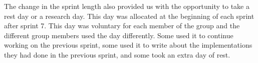 
The change in the sprint length also provided us with the opportunity to take a rest day or a research day. This day was allocated at the beginning of each sprint after sprint 7. This day was voluntary for each member of the group and the different group members used the day differently. Some used it to continue working on the previous sprint, some used it to write about the implementations they had done in the previous sprint, and some took an extra day of rest.
